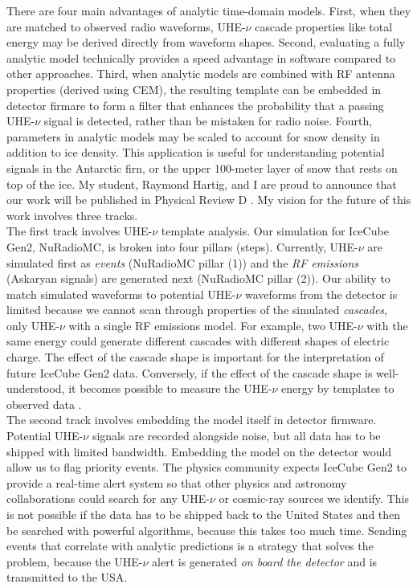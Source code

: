 \documentclass[../../../main.tex]{subfiles}
\begin{document}
There are four main advantages of analytic time-domain models. First, when they are matched to observed radio waveforms, UHE-$\nu$ cascade properties like total energy may be derived directly from waveform shapes. Second, evaluating a fully analytic model technically provides a speed advantage in software compared to other approaches. Third, when analytic models are combined with RF antenna properties (derived using CEM), the resulting template can be embedded in detector firmare to form a filter that enhances the probability that a passing UHE-$\nu$ signal is detected, rather than be mistaken for radio noise. Fourth, parameters in analytic models may be scaled to account for snow density in addition to ice density. This application is useful for understanding potential signals in the Antarctic firn, or the upper 100-meter layer of snow that rests on top of the ice.  My student, Raymond Hartig, and I are proud to announce that our work will be published in Physical Review D \cite{time}.  My vision for the future of this work involves three tracks.
\\
\vspace{0.25cm}
The first track involves UHE-$\nu$ template analysis.  Our simulation for IceCube Gen2, NuRadioMC, is broken into four pillars (steps).  Currently, UHE-$\nu$ are simulated first as \textit{events} (NuRadioMC pillar (1)) and the \textit{RF emissions} (Askaryan signals) are generated next (NuRadioMC pillar (2)).  Our ability to match simulated waveforms to potential UHE-$\nu$ waveforms from the detector is limited because we cannot scan through properties of the simulated \textit{cascades}, only UHE-$\nu$ with a single RF emissions model.  For example, two UHE-$\nu$ with the same energy could generate different cascades with different shapes of electric charge.  The effect of the cascade shape is important for the interpretation of future IceCube Gen2 data.  Conversely, if the effect of the cascade shape is well-understood, it becomes possible to measure the UHE-$\nu$ energy by templates to observed data \cite{time}.
\\
\vspace{0.25cm}
The second track involves embedding the model itself in detector firmware.  Potential UHE-$\nu$ signals are recorded alongside noise, but all data has to be shipped with limited bandwidth.  Embedding the model on the detector would allow us to flag priority events.  The physics community expects IceCube Gen2 to provide a real-time alert system so that other physics and astronomy collaborations could search for any UHE-$\nu$ or cosmic-ray sources we identify.  This is not possible if the data has to be shipped back to the United States and then be searched with powerful algorithms, because this takes too much time.  Sending events that correlate with analytic predictions is a strategy that solves the problem, because the UHE-$\nu$ alert is generated \textit{on board the detector} and is transmitted to the USA.
\end{document}
